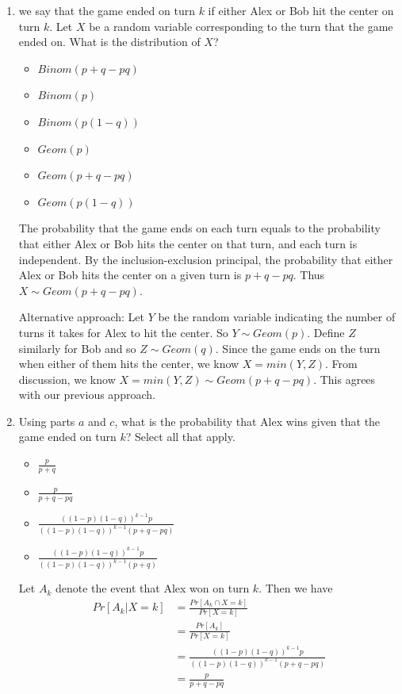 \documentclass[11pt, preview]{standalone} %
\begin{document}
\begin{enumerate}
\begin{enumerate}
    \item we say that the game ended on turn $k$ if either Alex or Bob hit the center on turn $k$. Let $X$ be a random variable corresponding to the turn that the game ended on. What is the distribution of $X$?
    \begin{Choices}
    \begin{itemize}
    	\FalseChoice\item $Binom(p+q-pq)$
    	\FalseChoice\item $Binom(p)$
    	\FalseChoice\item $Binom(p(1-q))$
    	\FalseChoice\item $Geom(p)$
    	\TrueChoice\item $Geom(p+q-pq)$
    	\FalseChoice\item $Geom(p(1-q))$
    \end{itemize}

    \Solution The probability that the game ends on each turn equals to the probability that either Alex or Bob hits the center on that turn, and each turn is independent. By the inclusion-exclusion principal, the probability that either Alex or Bob hits the center on a given turn is $p+q-pq$. Thus $X \sim Geom(p+q-pq)$. 

    Alternative approach: Let $Y$ be the random variable indicating the number of turns it takes for Alex to hit the center. So $Y \sim Geom(p)$. Define $Z$ similarly for Bob and so $Z \sim Geom(q)$. Since the game ends on the turn when either of them hits the center, we know $X = min(Y, Z)$. From discussion, we know $X = min(Y, Z) \sim Geom(p + q - pq)$. This agrees with our previous approach. 
    \end{Choices}
    

    \item  Using parts $a$ and $c$, what is the probability that Alex wins given that the game ended on turn $k$? Select all that apply. 
    \begin{Multi}{}
    \begin{itemize}
    	\FalseChoice\item $\frac{p}{p+q}$
    	\TrueChoice\item $\frac{p}{p+q-pq}$
    	\TrueChoice\item $\frac{((1-p)(1-q))^{k-1}p}{((1-p)(1-q))^{k-1}(p+q-pq)}$
    	\FalseChoice\item $\frac{((1-p)(1-q))^{k-1}p}{((1-p)(1-q))^{k-1}(p+q)}$
    \end{itemize}
    \Solution Let $A_k$ denote the event that Alex won on turn $k$. Then we have
        \begin{align*}
            Pr[A_k | X=k] &= \frac{Pr[A_k \cap X=k]}{Pr[X=k]}\\
            &= \frac{Pr[A_k]}{Pr[X=k]}\\
            &= \frac{((1-p)(1-q))^{k-1}p}{((1-p)(1-q))^{k-1}(p+q-pq)}\\
            &=\frac{p}{p+q-pq}
        \end{align*}


\end{Multi}
\end{enumerate}
\end{enumerate}
\end{document}
